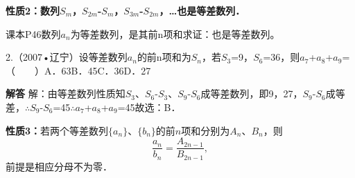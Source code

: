\par\medskip\noindent\textbf{性质2：数列\ensuremath{S_{m}}，\ensuremath{S_{2m}}-\ensuremath{S_{m}}，\ensuremath{S_{3m}}-\ensuremath{S_{2m}}，\ldots{}也是等差数列．}\par
\qquad{}课本P46数列{\ensuremath{a_{n}}}为等差数列，是其前n项和求证：也是等差数列。\par
{}
2.（2007•辽宁）设等差数列{\ensuremath{a_{n}}}的前n项和为\ensuremath{S_{n}}，若\ensuremath{S_{3}}=9，\ensuremath{S_{6}}=36，则\ensuremath{a_{7}}+\ensuremath{a_{8}}+\ensuremath{a_{9}}=（　　）A．63\qquad{}B．45\qquad{}C．36\qquad{}D．27\qquad{}\par
\QuestionSpace{1.2cm}
\ifshowanswers
\par\begingroup\color{solutioncolor}\noindent\textbf{解答}\quad
解：由等差数列性质知\ensuremath{S_{3}}、\ensuremath{S_{6}}-\ensuremath{S_{3}}、\ensuremath{S_{9}}-\ensuremath{S_{6}}成等差数列，即9，27，\ensuremath{S_{9}}-\ensuremath{S_{6}}成等差，\ensuremath{\therefore}\ensuremath{S_{9}}-\ensuremath{S_{6}}=45\ensuremath{\therefore}\ensuremath{a_{7}}+\ensuremath{a_{8}}+\ensuremath{a_{9}}=45故选：B．\par
\par\endgroup\fi

\par\medskip\noindent\textbf{性质3：}若两个等差数列$\{a_n\}$、$\{b_n\}$的前$n$项和分别为$A_n$、$B_n$，则
\[
\frac{a_n}{b_n}=\frac{A_{2n-1}}{B_{2n-1}},
\]
前提是相应分母不为零．\par

